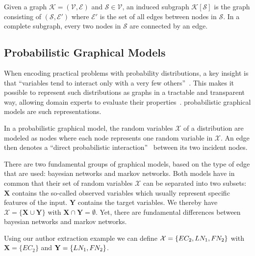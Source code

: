Given a \gls{graph} $\mathcal{K} = (\mathcal{V},\mathcal{E})$ and $\mathcal{S}\in\mathcal{V}$, an induced \gls{subgraph} $\mathcal{K}[\mathcal{S}]$ is the \gls{graph} consisting of $(\mathcal{S},\mathcal{E'})$ where $\mathcal{E'}$ is the set of all \glspl{edge} between \glspl{node} in $\mathcal{S}$.
In a complete \gls{subgraph}, every two \glspl{node} in $\mathcal{S}$ are connected by an \gls{edge}.

\subsection{Probabilistic Graphical Models}\label{subsec:graphical-models}
When encoding practical problems with \glspl{probability distribution}, a key insight is that ``variables tend to interact only with a very few others''~\citep{koller2009probabilistic}.
This makes it possible to represent such distributions as graphs in a tractable and transparent way, allowing domain experts to evaluate their properties~\citep{koller2009probabilistic}.
\Glspl{probabilistic graphical model} are such representations.

\bigskip

In a \gls{probabilistic graphical model}, the \glspl{random variable} $\mathcal{X}$ of a distribution are modeled as \glspl{node} where each \gls{node} represents one \gls{random variable} in $\mathcal{X}$. An \gls{edge} then denotes a ``direct probabilistic interaction''~\citep{koller2009probabilistic} between its two incident \glspl{node}.

There are two fundamental groups of graphical models, based on the type of edge that are used: \glspl{bayesian network} and \glspl{markov network}.
Both models have in common that their set of \glspl{random variable} $\mathcal{X}$ can be separated into two subsets:
$\mathbf{X}$ contains the so-called \glspl{observed variable} which usually represent specific features of the input.
$\mathbf{Y}$ contains the \glspl{target variable}.
We thereby have $\mathcal{X}=\{\mathbf{X}\cup\mathbf{Y}\}$ with $\mathbf{X}\cap\mathbf{Y}=\emptyset$.
Yet, there are fundamental differences between \glspl{bayesian network} and \glspl{markov network}.

Using our author extraction example we can define $\mathcal{X}=\{EC_2,LN_1,F\hspace{-0.07em} N_2\}$ with $\mathbf{X}=\{EC_2\}$ and $\mathbf{Y}=\{LN_1,F\hspace{-0.07em} N_2\}$.

\bigskip

